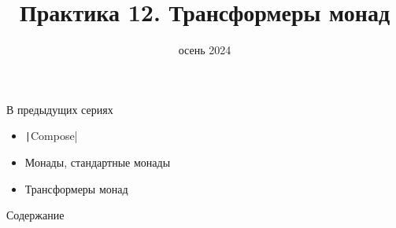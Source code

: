 
\newif\ifhandout




\title[12. Трансформеры монад]{Практика 12. Трансформеры монад}
\date{осень 2024}



    \setcounter{framenumber}{-1}
    \maketitle

    \begin{frame}[fragile]{В предыдущих сериях}
        \begin{itemize}
            \item \texttt|Compose|
            \item Монады, стандартные монады
            \item[\newtopic] Трансформеры монад
        \end{itemize}
    \end{frame}

    \begin{frame}[noframenumbering]{Содержание}
        \tableofcontents
    \end{frame}



